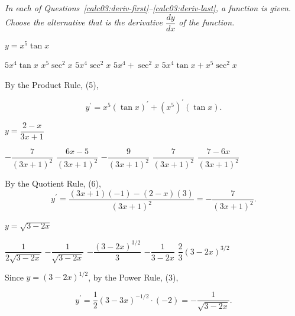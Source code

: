 % 
% 
\begin{EnvFullwidth}
\textit{In each of Questions~\ref{calc03:deriv-first}--\ref{calc03:deriv-last}, a function is given. Choose the alternative that is the derivative $\dfrac{d y}{d x}$ of the function.}
\end{EnvFullwidth} 

\question\label{calc03:deriv-first}
$y=x^{5} \tan x$
\begin{choices}
  \choice $5 x^{4} \tan x$
  \choice $x^{5} \sec ^{2} x$
  \choice $5 x^{4} \sec ^{2} x$
  \choice $5 x^{4}+\sec ^{2} x$
  \CorrectChoice $5 x^{4} \tan x+x^{5} \sec ^{2} x$
\end{choices}
\begin{solution}
By the Product Rule, (5),


\[
y^{\prime}=x^{5}(\tan x)^{\prime}+\left(x^{5}\right)^{\prime}(\tan x) .
\]


\end{solution}

\question
$y=\dfrac{2-x}{3 x+1}$
\begin{choices}
  \CorrectChoice $-\dfrac{7}{(3 x+1)^{2}}$
  \choice $\dfrac{6 x-5}{(3 x+1)^{2}}$
  \choice $-\dfrac{9}{(3 x+1)^{2}}$
  \choice $\dfrac{7}{(3 x+1)^{2}}$
  \choice $\dfrac{7-6 x}{(3 x+1)^{2}}$
\end{choices}
\begin{solution}
By the Quotient Rule, (6),
\[
y^{\prime}=\dfrac{(3 x+1)(-1)-(2-x)(3)}{(3 x+1)^{2}}=-\dfrac{7}{(3 x+1)^{2}} .
\]
\end{solution}


\newpage


\question
$y=\sqrt{3-2 x}$
\begin{choices}
  \choice $\dfrac{1}{2 \sqrt{3-2 x}}$
  \CorrectChoice $-\dfrac{1}{\sqrt{3-2 x}}$
  \choice $-\dfrac{(3-2 x)^{3 / 2}}{3}$
  \choice $-\dfrac{1}{3-2 x}$
  \choice $\dfrac{2}{3}(3-2 x)^{3 / 2}$
\end{choices}
\begin{solution}
Since $y=(3-2 x)^{1 / 2}$, by the Power Rule, (3),


\[
y^{\prime}=\dfrac{1}{2}(3-3 x)^{-1 / 2} \cdot(-2)=-\dfrac{1}{\sqrt{3-2 x}} .
\]


\end{solution}

